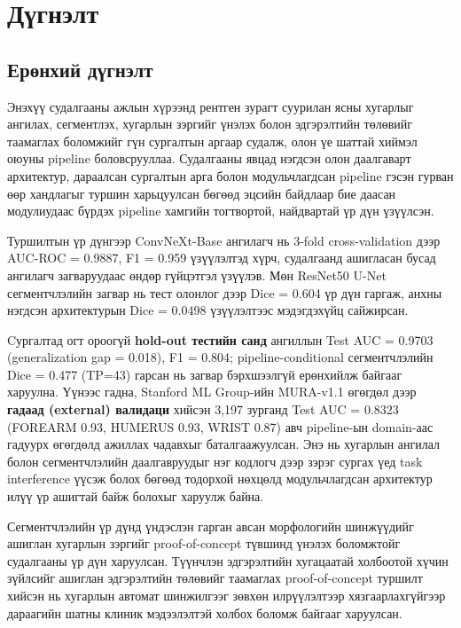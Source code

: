 
\chapter{Дүгнэлт}
\label{Conclusion}
\pagecolor{white}

\section*{Ерөнхий дүгнэлт}

Энэхүү судалгааны ажлын хүрээнд рентген зурагт суурилан ясны хугарлыг ангилах, сегментлэх, хугарлын зэргийг үнэлэх болон эдгэрэлтийн төлөвийг таамаглах боломжийг гүн сургалтын аргаар судалж, олон үе шаттай хиймэл оюуны pipeline боловсрууллаа. Судалгааны явцад нэгдсэн олон даалгаварт архитектур, дараалсан сургалтын арга болон модульчлагдсан pipeline гэсэн гурван өөр хандлагыг туршин харьцуулсан бөгөөд эцсийн байдлаар бие даасан модулиудаас бүрдэх pipeline хамгийн тогтвортой, найдвартай үр дүн үзүүлсэн.

Туршилтын үр дүнгээр ConvNeXt-Base ангилагч нь 3-fold cross-validation дээр AUC-ROC = 0.9887, F1 = 0.959 үзүүлэлтэд хүрч, судалгаанд ашигласан бусад ангилагч загваруудаас өндөр гүйцэтгэл үзүүлэв. Мөн ResNet50 U-Net сегментчлэлийн загвар нь тест олонлог дээр Dice = 0.604 үр дүн гаргаж, анхны нэгдсэн архитектурын Dice = 0.0498 үзүүлэлтээс мэдэгдэхүйц сайжирсан.

Cургалтад огт ороогүй \textbf{hold-out тестийн санд} ангиллын Test AUC = 0.9703 (generalization gap = 0.018), F1 = 0.804; pipeline-conditional сегментчлэлийн Dice = 0.477 (TP=43) гарсан нь загвар бэрхшээлгүй ерөнхийлж байгааг харуулна. Үүнээс гадна, Stanford ML Group-ийн MURA-v1.1 өгөгдөл дээр \textbf{гадаад (external) валидаци} хийсэн 3{,}197 зурганд Test AUC = 0.8323 (FOREARM 0.93, HUMERUS 0.93, WRIST 0.87) авч pipeline-ын domain-аас гадуурх өгөгдөлд ажиллах чадавхыг баталгаажуулсан. Энэ нь хугарлын ангилал болон сегментчлэлийн даалгавруудыг нэг кодлогч дээр зэрэг сургах үед task interference үүсэж болох бөгөөд тодорхой нөхцөлд модульчлагдсан архитектур илүү үр ашигтай байж болохыг харуулж байна.

Сегментчлэлийн үр дүнд үндэслэн гарган авсан морфологийн шинжүүдийг ашиглан хугарлын зэргийг proof-of-concept түвшинд үнэлэх боломжтойг судалгааны үр дүн харуулсан. Түүнчлэн эдгэрэлтийн хугацаатай холбоотой хүчин зүйлсийг ашиглан эдгэрэлтийн төлөвийг таамаглах proof-of-concept туршилт хийсэн нь хугарлын автомат шинжилгээг зөвхөн илрүүлэлтээр хязгаарлахгүйгээр дараагийн шатны клиник мэдээлэлтэй холбох боломж байгааг харуулсан.

